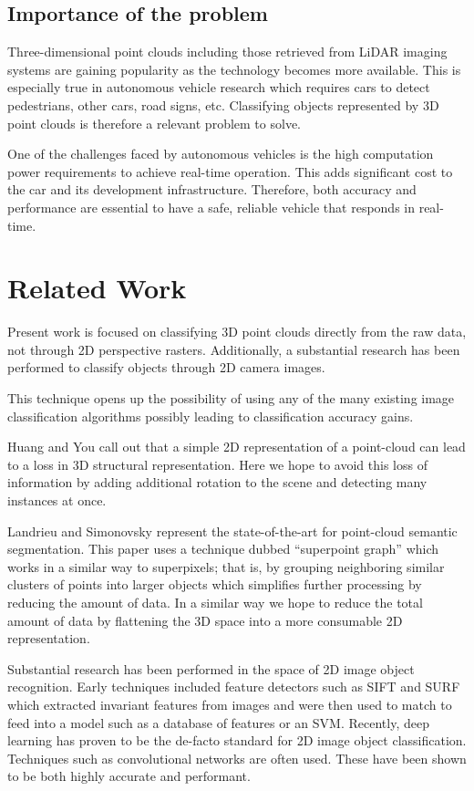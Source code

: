 \documentclass[runningheads,a4paper]{llncs}
\begin{document}
\subsection{Importance of the problem}
Three-dimensional point clouds including those retrieved from LiDAR imaging
systems are gaining popularity as the technology becomes more available. This is
especially true in autonomous vehicle research which requires cars to detect
pedestrians, other cars, road signs, etc. Classifying objects represented by 3D
point clouds is therefore a relevant problem to solve.

One of the challenges faced by autonomous vehicles is the high computation power
requirements to achieve real-time operation. This adds significant cost to the
car and its development infrastructure. Therefore, both accuracy and performance
are essential to have a safe, reliable vehicle that responds in real-time.

\section{Related Work}
Present work is focused on classifying 3D point clouds directly from the raw
data, not through 2D perspective rasters. Additionally, a substantial research
has been performed to classify objects through 2D camera images. 

This technique opens up the possibility of using any of the many existing image
classification algorithms possibly leading to classification accuracy gains.

Huang and You \cite{huang2016point} call out that a simple 2D representation of
a point-cloud can lead to a loss in 3D structural representation. Here we hope
to avoid this loss of information by adding additional rotation to the scene
and detecting many instances at once.

Landrieu and Simonovsky \cite{landrieu2018large} represent the state-of-the-art
for point-cloud semantic segmentation. This paper uses a technique dubbed
``superpoint graph'' which works in a similar way to superpixels; that is, by
grouping neighboring similar clusters of points into larger objects which
simplifies further processing by reducing the amount of data. In a similar way
we hope to reduce the total amount of data by flattening the 3D space into a
more consumable 2D representation.

Substantial research has been performed in the space of 2D image object
recognition. Early techniques included feature detectors such as SIFT and SURF
which extracted invariant features from images and were then used to match to
feed into a model such as a database of features or an SVM. Recently, deep
learning has proven to be the de-facto standard for 2D image object
classification. Techniques such as convolutional networks are often used. These
have been shown to be both highly accurate and performant.
\end{document}

